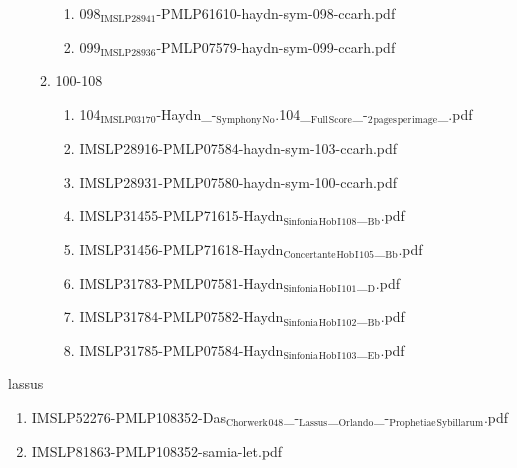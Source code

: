 \documentclass[11pt]{article}
\begin{document}
\begin{enumerate}
\begin{enumerate}
\begin{enumerate}
\item 098$_{\text{IMSLP28941}}$-PMLP61610-haydn-sym-098-ccarh.pdf
\label{sec-1-1-1-1-44-38-7-10-9}

\item 099$_{\text{IMSLP28936}}$-PMLP07579-haydn-sym-099-ccarh.pdf
\label{sec-1-1-1-1-44-38-7-10-10}
\end{enumerate}

\item 100-108
\label{sec-1-1-1-1-44-38-7-11}
\begin{enumerate}
\item 104$_{\text{IMSLP03170}}$-Haydn\_-$_{\text{Symphony}}$$_{\text{No}}$.104\_$_{\text{Full}}$$_{\text{Score}}$\_-$_{\text{2}}$$_{\text{pages}}$$_{\text{per}}$$_{\text{image}}$\_.pdf
\label{sec-1-1-1-1-44-38-7-11-1}

\item IMSLP28916-PMLP07584-haydn-sym-103-ccarh.pdf
\label{sec-1-1-1-1-44-38-7-11-2}

\item IMSLP28931-PMLP07580-haydn-sym-100-ccarh.pdf
\label{sec-1-1-1-1-44-38-7-11-3}

\item IMSLP31455-PMLP71615-Haydn$_{\text{Sinfonia}}$$_{\text{Hob}}$$_{\text{I}}$$_{\text{108}}$\_$_{\text{Bb}}$.pdf
\label{sec-1-1-1-1-44-38-7-11-4}

\item IMSLP31456-PMLP71618-Haydn$_{\text{Concertante}}$$_{\text{Hob}}$$_{\text{I}}$$_{\text{105}}$\_$_{\text{Bb}}$.pdf
\label{sec-1-1-1-1-44-38-7-11-5}

\item IMSLP31783-PMLP07581-Haydn$_{\text{Sinfonia}}$$_{\text{Hob}}$$_{\text{I}}$$_{\text{101}}$\_$_{\text{D}}$.pdf
\label{sec-1-1-1-1-44-38-7-11-6}

\item IMSLP31784-PMLP07582-Haydn$_{\text{Sinfonia}}$$_{\text{Hob}}$$_{\text{I}}$$_{\text{102}}$\_$_{\text{Bb}}$.pdf
\label{sec-1-1-1-1-44-38-7-11-7}

\item IMSLP31785-PMLP07584-Haydn$_{\text{Sinfonia}}$$_{\text{Hob}}$$_{\text{I}}$$_{\text{103}}$\_$_{\text{Eb}}$.pdf
\label{sec-1-1-1-1-44-38-7-11-8}
\end{enumerate}
\end{enumerate}
\end{enumerate}

\item lassus
\label{sec-1-1-1-1-44-39}
\begin{enumerate}
\item IMSLP52276-PMLP108352-Das$_{\text{Chorwerk}}$$_{\text{048}}$\_-$_{\text{Lassus}}$\_$_{\text{Orlando}}$\_-$_{\text{Prophetiae}}$$_{\text{Sybillarum}}$.pdf
\label{sec-1-1-1-1-44-39-1}

\item IMSLP81863-PMLP108352-samia-let.pdf
\label{sec-1-1-1-1-44-39-2}
\end{enumerate}
\end{document}
